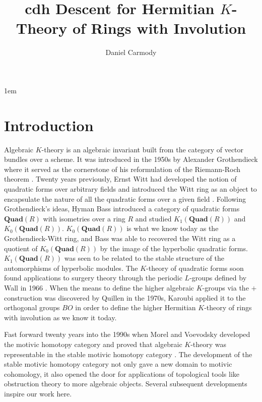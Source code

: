 \documentclass[edeposit,fullpage]{uiucthesis2009}
\title{cdh Descent for Hermitian $K$-Theory of Rings with Involution}
\author{Daniel Carmody}
\newcommand{\Quad}{\mathbf{Quad}}
\theoremstyle{plain}
\numberwithin{lemma}{section}
\theoremstyle{definition}
\begin{document}
\maketitle

\parindent 1em%

\frontmatter

\tableofcontents

\mainmatter

\chapter{Introduction}

Algebraic $K$-theory is an algebraic invariant built from the category of vector bundles over a scheme. It was introduced in the 1950s by Alexander
Grothendieck where it served as the cornerstone of his reformulation
of the Riemann-Roch theorem \cite{Gro57}.  Twenty years previously, Ernst Witt had
developed the notion of quadratic forms over arbitrary fields and
introduced the Witt ring as an object to encapsulate the nature of
all the quadratic forms over a given field \cite{Witt1937}. Following
Grothendieck's ideas, Hyman Bass introduced a category of quadratic
forms  $\Quad(R)$
with isometries over a ring $R$ and studied $K_1(\Quad(R))$ and $K_0(\Quad(R))$. $K_0(\Quad(R))$ is what we know today as the
Grothendieck-Witt ring, and Bass was able to recovered the Witt ring
as a quotient of $K_0(\Quad(R))$ by the image of the hyperbolic
quadratic forms. $K_1(\Quad(R))$ was seen to be related to the stable
structure of the automorphisms of hyperbolic modules. The $K$-theory
of quadratic forms soon found applications to surgery theory through
the periodic $L$-groups defined by Wall in 1966 \cite{Wall66}. When
the means to define the higher algebraic $K$-groups via the $+$ construction was discovered by
Quillen in the 1970s, Karoubi applied it to the orthogonal groups $BO$
in order to define the higher Hermitian $K$-theory of rings with
involution as we know it today\cite{Kar73}.

Fast forward twenty years into the 1990s when Morel and Voevodsky
developed the motivic homotopy category and proved that algebraic
$K$-theory was representable in the stable motivic homotopy category
\cite{MorelVoev}. The development of the stable motivic homotopy
category not only gave a new domain to motivic cohomology, it also
opened the door for applications of topological tools like obstruction
theory to
more algebraic objects. Several
subsequent developments inspire our work here.
\end{document}

